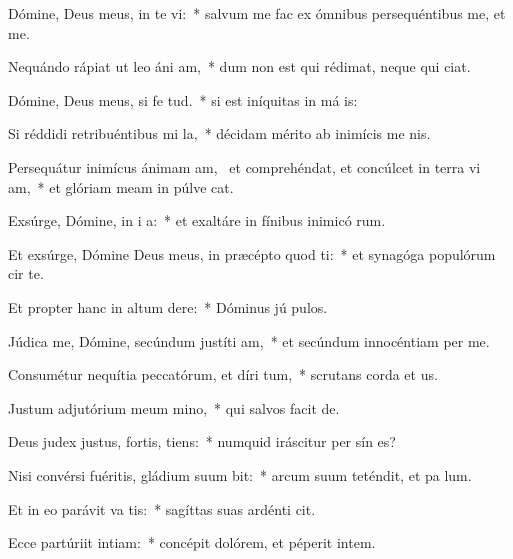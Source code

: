 \item Dómine, Deus meus, in te vi:~* salvum me fac ex ómnibus persequéntibus me, et  me.
\item Nequándo rápiat ut leo áni am,~* dum non est qui rédimat, neque qui  ciat.
\item Dómine, Deus meus, si fe tud.~* si est iníquitas in má is:
\item Si réddidi retribuéntibus mi la,~* décidam mérito ab inimícis me nis.
\item Persequátur inimícus ánimam am,~\pscross{} et comprehéndat, et concúlcet in terra vi am,~* et glóriam meam in púlve cat.
\item Exsúrge, Dómine, in i a:~* et exaltáre in fínibus inimicó rum.
\item Et exsúrge, Dómine Deus meus, in præcépto quod ti:~* et synagóga populórum cir te.
\item Et propter hanc in altum dere:~* Dóminus jú pulos.
\item Júdica me, Dómine, secúndum justíti am,~* et secúndum innocéntiam  per me.
\item Consumétur nequítia peccatórum, et díri tum,~* scrutans corda et  us.
\item Justum adjutórium meum  mino,~* qui salvos facit  de.
\item Deus judex justus, fortis,  tiens:~* numquid iráscitur per sín es?
\item Nisi convérsi fuéritis, gládium suum bit:~* arcum suum teténdit, et pa lum.
\item Et in eo parávit va tis:~* sagíttas suas ardénti cit.
\item Ecce partúriit intiam:~* concépit dolórem, et péperit intem.
